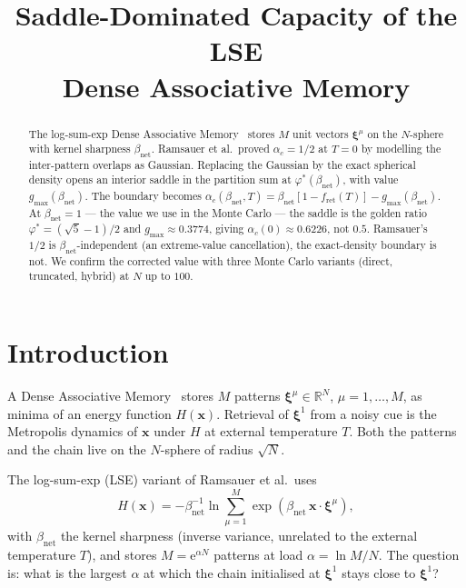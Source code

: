 \documentclass[11pt]{article}
\title{\bfseries Saddle-Dominated Capacity of the LSE\\
Dense Associative Memory}
\author{}
\date{}
\newcommand{\bxi}{\boldsymbol{\xi}}
\newcommand{\bx}{\bm{x}}
\newcommand{\e}{{\mathrm{e}}}
\newcommand{\Bnet}{\beta_{\mathrm{net}}}
\newcommand{\fret}{f_{\mathrm{ret}}}
\newcommand{\gmax}{g_{\max}}
\begin{document}
\maketitle

\begin{abstract}
\noindent
[Placeholder.]  The log-sum-exp Dense Associative
Memory~\citep{ramsauer2021hopfield} stores $M$ unit vectors $\bxi^\mu$ on
the $N$-sphere with kernel sharpness $\Bnet$.  Ramsauer et al.\ proved
$\alpha_c = 1/2$ at $T = 0$ by modelling the inter-pattern overlaps as
Gaussian.  Replacing the Gaussian by the exact spherical density opens
an interior saddle in the partition sum at $\varphi^{*}(\Bnet)$, with
value $\gmax(\Bnet)$.  The boundary becomes
$\alpha_c(\Bnet, T) = \Bnet[1 - \fret(T)] - \gmax(\Bnet)$.  At
$\Bnet = 1$ — the value we use in the Monte Carlo — the saddle is the
golden ratio $\varphi^{*} = (\sqrt 5 - 1)/2$ and
$\gmax \approx 0.3774$, giving $\alpha_c(0) \approx 0.6226$, not $0.5$.
Ramsauer's $1/2$ is $\Bnet$-independent (an extreme-value cancellation),
the exact-density boundary is not.  We confirm the corrected value with
three Monte Carlo variants (direct, truncated, hybrid) at $N$ up to
$100$.
\end{abstract}

\section{Introduction}
\label{sec:intro}

A Dense Associative Memory~\citep{krotov2016dense} stores $M$ patterns
$\bxi^\mu \in \mathbb{R}^N$, $\mu = 1, \dots, M$, as minima of an energy
function $H(\bx)$.  Retrieval of $\bxi^1$ from a noisy cue is the
Metropolis dynamics of $\bx$ under $H$ at external temperature $T$.  Both
the patterns and the chain live on the $N$-sphere of radius $\sqrt N$.

The log-sum-exp (LSE) variant of Ramsauer et al.\ uses
\begin{equation}
H(\bx) = -\Bnet^{-1} \ln \sum_{\mu=1}^{M} \exp(\Bnet\,\bx \cdot \bxi^\mu),
\label{eq:lse}
\end{equation}
with $\Bnet$ the kernel sharpness (inverse variance, unrelated to the
external temperature $T$), and stores $M = \e^{\alpha N}$ patterns at
load $\alpha = \ln M / N$.  The question is: what is the largest
$\alpha$ at which the chain initialised at $\bxi^1$ stays close to
$\bxi^1$?
\end{document}
